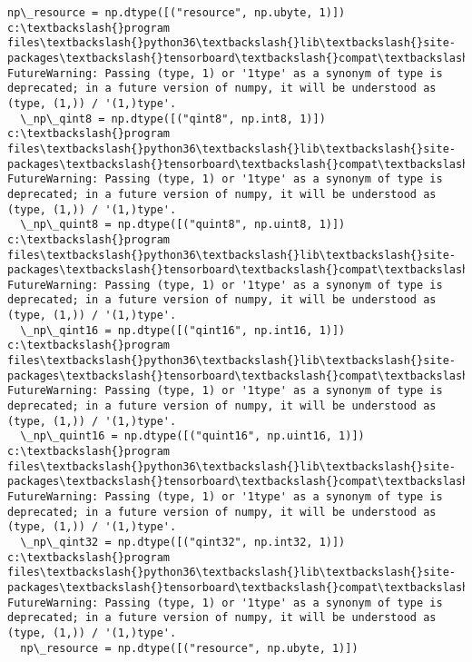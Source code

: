 \documentclass[11pt]{article}
\begin{document}
\begin{Verbatim}[commandchars=\\\{\}]
  np\_resource = np.dtype([("resource", np.ubyte, 1)])
c:\textbackslash{}program files\textbackslash{}python36\textbackslash{}lib\textbackslash{}site-packages\textbackslash{}tensorboard\textbackslash{}compat\textbackslash{}tensorflow\_stub\textbackslash{}dtypes.py:541: FutureWarning: Passing (type, 1) or '1type' as a synonym of type is deprecated; in a future version of numpy, it will be understood as (type, (1,)) / '(1,)type'.
  \_np\_qint8 = np.dtype([("qint8", np.int8, 1)])
c:\textbackslash{}program files\textbackslash{}python36\textbackslash{}lib\textbackslash{}site-packages\textbackslash{}tensorboard\textbackslash{}compat\textbackslash{}tensorflow\_stub\textbackslash{}dtypes.py:542: FutureWarning: Passing (type, 1) or '1type' as a synonym of type is deprecated; in a future version of numpy, it will be understood as (type, (1,)) / '(1,)type'.
  \_np\_quint8 = np.dtype([("quint8", np.uint8, 1)])
c:\textbackslash{}program files\textbackslash{}python36\textbackslash{}lib\textbackslash{}site-packages\textbackslash{}tensorboard\textbackslash{}compat\textbackslash{}tensorflow\_stub\textbackslash{}dtypes.py:543: FutureWarning: Passing (type, 1) or '1type' as a synonym of type is deprecated; in a future version of numpy, it will be understood as (type, (1,)) / '(1,)type'.
  \_np\_qint16 = np.dtype([("qint16", np.int16, 1)])
c:\textbackslash{}program files\textbackslash{}python36\textbackslash{}lib\textbackslash{}site-packages\textbackslash{}tensorboard\textbackslash{}compat\textbackslash{}tensorflow\_stub\textbackslash{}dtypes.py:544: FutureWarning: Passing (type, 1) or '1type' as a synonym of type is deprecated; in a future version of numpy, it will be understood as (type, (1,)) / '(1,)type'.
  \_np\_quint16 = np.dtype([("quint16", np.uint16, 1)])
c:\textbackslash{}program files\textbackslash{}python36\textbackslash{}lib\textbackslash{}site-packages\textbackslash{}tensorboard\textbackslash{}compat\textbackslash{}tensorflow\_stub\textbackslash{}dtypes.py:545: FutureWarning: Passing (type, 1) or '1type' as a synonym of type is deprecated; in a future version of numpy, it will be understood as (type, (1,)) / '(1,)type'.
  \_np\_qint32 = np.dtype([("qint32", np.int32, 1)])
c:\textbackslash{}program files\textbackslash{}python36\textbackslash{}lib\textbackslash{}site-packages\textbackslash{}tensorboard\textbackslash{}compat\textbackslash{}tensorflow\_stub\textbackslash{}dtypes.py:550: FutureWarning: Passing (type, 1) or '1type' as a synonym of type is deprecated; in a future version of numpy, it will be understood as (type, (1,)) / '(1,)type'.
  np\_resource = np.dtype([("resource", np.ubyte, 1)])

    \end{Verbatim}
\end{document}
